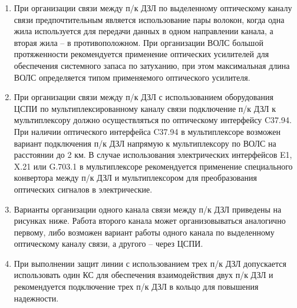 \begin{enumerate}
\begin{enumerate}

\item При организации связи между п/к ДЗЛ по выделенному оптическому каналу связи предпочтительным является использование пары волокон, когда одна жила используется для передачи данных в одном направлении канала, а вторая жила -- в противоположном. При организации ВОЛС большой протяженности рекомендуется применение оптических усилителей для обеспечения системного запаса по затуханию, при этом максимальная длина ВОЛС определяется типом применяемого оптического усилителя.

\item При организации связи между п/к ДЗЛ с использованием оборудования ЦСПИ по мультиплексированному каналу связи подключение п/к ДЗЛ к мультиплексору должно осуществляться по оптическому интерфейсу C37.94. При наличии оптического интерфейса C37.94 в мультиплексоре возможен вариант подключения п/к ДЗЛ напрямую к мультиплексору по ВОЛС на расстоянии до 2 км. В случае использования электрических интерфейсов E1, X.21 или G.703.1 в мультиплексоре рекомендуется применение специального конвертора между п/к ДЗЛ и мультиплексором для преобразования оптических сигналов в электрические.

\item Варианты организации одного канала связи между п/к ДЗЛ приведены на рисунках ниже. Работа второго канала может организовываться аналогично первому, либо возможен вариант работы одного канала по выделенному оптическому каналу связи, а другого -- через ЦСПИ.

\item При выполнении защит линии с использованием трех п/к ДЗЛ допускается использовать один КС для обеспечения взаимодействия двух п/к ДЗЛ и рекомендуется подключение трех п/к ДЗЛ в кольцо для повышения надежности.





\end{enumerate}
\end{enumerate}
